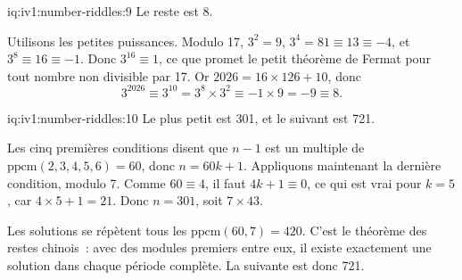 \enlargethispage{-3\baselineskip}%
\begin{solution}{iq:iv1:number-riddles:9}
Le reste est 8.

Utilisons les petites puissances. Modulo 17, $3^2 = 9$, $3^4 = 81 \equiv 13 \equiv -4$, et $3^8 \equiv 16 \equiv -1$. Donc $3^{16} \equiv 1$, ce que promet le petit théorème de Fermat pour tout nombre non divisible par 17. Or $2026 = 16 \times 126 + 10$, donc
\[
3^{2026} \equiv 3^{10} = 3^8 \times 3^2 \equiv -1 \times 9 = -9 \equiv 8.
\]

\end{solution}

\begin{solution}{iq:iv1:number-riddles:10}
Le plus petit est 301, et le suivant est 721.

Les cinq premières conditions disent que $n - 1$ est un multiple de $\mathrm{ppcm}(2, 3, 4, 5, 6) = 60$, donc $n = 60k + 1$. Appliquons maintenant la dernière condition, modulo 7. Comme $60 \equiv 4$, il faut $4k + 1 \equiv 0$, ce qui est vrai pour $k = 5$, car $4 \times 5 + 1 = 21$. Donc $n = 301$, soit $7 \times 43$.

Les solutions se répètent tous les $\mathrm{ppcm}(60, 7) = 420$. C'est le théorème des restes chinois~: avec des modules premiers entre eux, il existe exactement une solution dans chaque période complète. La suivante est donc 721.

\end{solution}

